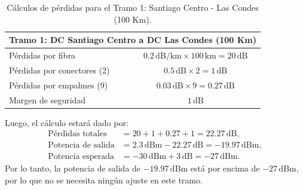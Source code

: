 \begin{itemize}
\begin{table}[H]
	\centering
	\renewcommand{\arraystretch}{1.5} %
	\begin{tabular}{|l|c|}
	\hline
	\multicolumn{2}{|c|}{\textbf{Tramo 1: DC Santiago Centro a DC Las Condes (100 Km)}} \\ \hline
	Pérdidas por fibra                 & $0.2 \, \text{dB/km} \times 100 \, \text{km} = 20 \, \text{dB}$ \\ \hline
	Pérdidas por conectores (2)        & $0.5 \, \text{dB} \times 2 = 1 \, \text{dB}$                    \\ \hline
	Pérdidas por empalmes (9)          & $0.03 \, \text{dB} \times 9 = 0.27 \, \text{dB}$                \\ \hline
	Margen de seguridad                & $1 \, \text{dB}$                                               \\ \hline
	\end{tabular}
	\caption{Cálculos de pérdidas para el Tramo 1: Santiago Centro - Las Condes (100 Km).}
	\label{tabla:tramo1}
\end{table}
Luego, el cálculo estará dado por:
\begin{align}
\text{Pérdidas totales} &= 20 + 1 + 0.27 + 1 = 22.27 \, \text{dB}, \\
\text{Potencia de salida} &= 2.3 \, \text{dBm} - 22.27 \, \text{dB} = -19.97 \, \text{dBm}, \\
\text{Potencia esperada} &= -30 \, \text{dBm} + 3 \, \text{dB} = -27 \, \text{dBm}.
\end{align}
Por lo tanto, la potencia de salida de \(-19.97 \, \text{dBm}\) está por encima de \(-27 \, \text{dBm}\), por lo que no se necesita ningún ajuste en este tramo.


\end{itemize}

